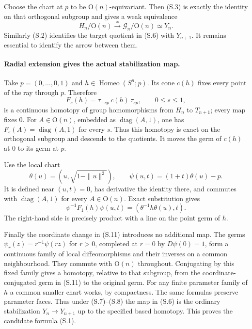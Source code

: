 Choose the chart at $p$ to be $\mathrm O(n)$-equivariant. Then
(S.3) is exactly the identity on that orthogonal subgroup and
gives a weak equivalence
\[
 H_n/\mathrm O(n)\xrightarrow{\simeq}
                \mathcal G_n/\mathrm O(n)\simeq Y_n.   \tag{S.8}
\]
Similarly (S.2) identifies the target quotient in (S.6) with
$Y_{n+1}$. It remains essential to identify the arrow between them.

\paragraph{Radial extension gives the actual stabilization map.}
Take $p=(0,\ldots,0,1)$ and $h\in\operatorname{Homeo}(S^n;p)$.
Its cone $c(h)$ fixes every point of the ray through $p$. Therefore
\[
 F_s(h)=\tau_{-sp}\,c(h)\,\tau_{sp},\qquad0\le s\le1,
                                                               \tag{S.9}
\]
is a continuous homotopy of group homomorphisms from $H_n$ to
$T_{n+1}$; every map fixes $0$. For $A\in\mathrm O(n)$,
embedded as $\operatorname{diag}(A,1)$, one has
$F_s(A)=\operatorname{diag}(A,1)$ for every $s$. Thus this homotopy
is exact on the orthogonal subgroup and descends to the quotients.
It moves the germ of $c(h)$ at $0$ to its germ at $p$.

Use the local chart
\[
 \theta(u)=(u,\sqrt{1-\|u\|^2}),\qquad
 \psi(u,t)=(1+t)\theta(u)-p.                            \tag{S.10}
\]
It is defined near $(u,t)=0$, has derivative the identity there,
and commutes with $\operatorname{diag}(A,1)$ for every
$A\in\mathrm O(n)$. Exact substitution gives
\[
 \psi^{-1}F_1(h)\psi(u,t)
                    =(\theta^{-1}h\theta(u),t).       \tag{S.11}
\]
The right-hand side is precisely product with a line on the
point germ of $h$.

Finally the coordinate change in (S.11) introduces no additional
map. The germs $\psi_r(z)=r^{-1}\psi(rz)$ for $r>0$, completed
at $r=0$ by $D\psi(0)=1$, form a continuous family of local
diffeomorphisms and their inverses on a common neighbourhood.
They commute with $\mathrm O(n)$ throughout. Conjugating by this
fixed family gives a homotopy, relative to that subgroup, from
the coordinate-conjugated germ in (S.11) to the original germ.
For any finite parameter family of $h$ a common smaller chart
works, by compactness. The same formulas preserve parameter faces.
Thus under (S.7)--(S.8) the map in (S.6) is the ordinary stabilization
$Y_n\to Y_{n+1}$ up to the specified based homotopy. This proves
the candidate formula (S.1).


